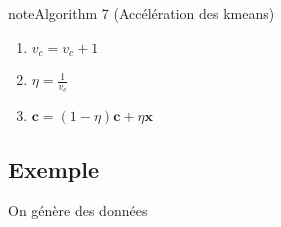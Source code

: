 \documentclass[letterpaper,10pt,english]{jupyterBook}
\begin{document}
\begin{sphinxadmonition}{note}{Algorithm 7 (Accélération des k\sphinxhyphen{}means)}
\begin{enumerate}
\begin{enumerate}
\begin{enumerate}
\item {} 
\sphinxAtStartPar
\(v_c = v_c + 1\)

\item {} 
\sphinxAtStartPar
\(\eta = \frac{1}{v_c}\)

\item {} 
\sphinxAtStartPar
\(\mathbf c = (1-\eta)\mathbf c + \eta \mathbf x\)

\end{enumerate}

\end{enumerate}

\end{enumerate}
\end{sphinxadmonition}


\subsection{Exemple}
\label{\detokenize{clustering:id3}}
\sphinxAtStartPar
On génère des données
\end{document}
